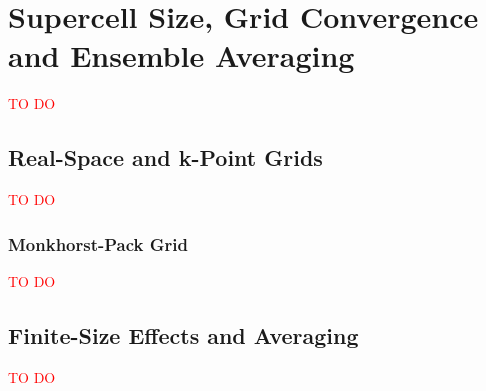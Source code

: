 \chapter{Supercell Size, Grid Convergence and Ensemble Averaging}

\textcolor{red}{TO DO}


\section{Real-Space and k-Point Grids}
\textcolor{red}{TO DO}

\subsection{Monkhorst-Pack Grid}
\textcolor{red}{TO DO}


\section{Finite-Size Effects and Averaging}
\textcolor{red}{TO DO}

